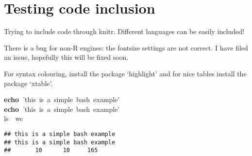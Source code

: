 \documentclass[output=inprep,
		biblatex
		]{LSP/langsci}\usepackage[]{graphicx}\usepackage[]{color}
\makeatletter
\newcommand{\hlstr}[1]{\textcolor[rgb]{0.651,0.522,0}{#1}}%
\newcommand{\hlstd}[1]{\textcolor[rgb]{0,0,0}{#1}}%
\newcommand{\hlkwb}[1]{\textcolor[rgb]{0.502,0.502,0.753}{\textbf{#1}}}%
\newcommand{\hlkwc}[1]{\textcolor[rgb]{0,0.502,0.753}{#1}}%
\newenvironment{kframe}{%
 \def\at@end@of@kframe{}%
 \ifinner\ifhmode%
  \def\at@end@of@kframe{\end{minipage}}%
  \begin{minipage}{\columnwidth}%
 \fi\fi%
 \def\FrameCommand##1{\hskip\@totalleftmargin \hskip-\fboxsep
 \colorbox{shadecolor}{##1}\hskip-\fboxsep
     \hskip-\linewidth \hskip-\@totalleftmargin \hskip\columnwidth}%
 \MakeFramed {\advance\hsize-\width
   \@totalleftmargin\z@ \linewidth\hsize
   \@setminipage}}%
 {\par\unskip\endMakeFramed%
 \at@end@of@kframe}
\newenvironment{knitrout}{}{} %
\makeatother
\begin{document}
\maketitle
\frontmatter
% 
% 
% 
\tableofcontents
\mainmatter%













\chapter{Testing code inclusion}


Trying to include code through knitr. 
Different languages can be easily 
included!

There is a bug for non-R engines: the fontsize settings are not correct. I have 
filed an issue, hopefully this will be fixed soon.

For syntax colouring, install the package `highlight' and for nice tables 
install the package `xtable'.

\begin{knitrout}\scriptsize
{}\color{fgcolor}\begin{kframe}
\noindent
\ttfamily
\hlstd{}\hlkwb{echo\ }\hlstd{}\hlstr{'this\ is\ a\ simple\ bash\ example'}\hlstd{}\hspace*{\fill}\\
\hlkwb{echo\ }\hlstd{}\hlstr{'this\ is\ a\ simple\ bash\ example'}\hlstd{}\hspace*{\fill}\\
\hlkwc{ls\ }\hlstd{\textbar \ }\hlkwc{wc}\hlstd{}\hspace*{\fill}
\mbox{}
\normalfont
\normalsize

\begin{verbatim}
## this is a simple bash example
## this is a simple bash example
##       10      10     165
\end{verbatim}
\end{kframe}
\end{knitrout}
\end{document}
